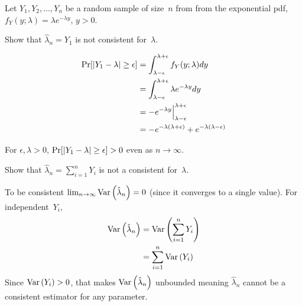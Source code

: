 \begin{problem}
   Let ${Y_1,Y_2,\ldots,Y_n}$ be a random sample of size~$n$ from from the exponential pdf, \linebreak${f_Y(y;\lambda) = \lambda e^{-\lambda y} \text{, } y > 0}$.
\end{problem}

\begin{subproblem}
  Show that ${\hat{\lambda}_n = Y_1}$ is not consistent for~$\lambda$.
\end{subproblem}




\begin{align}
  \Pr\lbrack\lvert Y_1 - \lambda\rvert \geq \epsilon\rbrack &= \int_{\lambda -\epsilon}^{\lambda + \epsilon} f_{Y}(y;\lambda) dy \\
                                                &= \int_{\lambda -\epsilon}^{\lambda + \epsilon} \lambda e^{-\lambda y} dy \\
                                                &= -e^{-\lambda y} \Big\vert_{\lambda -\epsilon}^{\lambda + \epsilon} \\
                                                &= -e^{-\lambda (\lambda + \epsilon)}  + e^{-\lambda (\lambda - \epsilon)}
\end{align}

For ${\epsilon,\lambda >0}$, ${\Pr\lbrack\lvert Y_1 - \lambda\rvert \geq \epsilon\rbrack > 0}$ even as ${n \rightarrow \infty}$.

\begin{subproblem}
  Show that ${\hat{\lambda}_n = \sum_{i=1}^{n} Y_i}$ is not a consistent for~$\lambda$.
\end{subproblem}

To be consistent ${\lim_{n \rightarrow \infty} \text{Var}\left(\hat{\lambda}_n\right) = 0}$ (since it converges to a single value). For independent~$Y_i$,
\begin{align}
  \text{Var}\left(\hat{\lambda}_n\right) &= \text{Var}\left(\sum_{i=1}^{n} Y_i\right) \\
                        &= \sum_{i=1}^{n} \text{Var}\left(Y_i\right)
\end{align}
Since ${\text{Var}\left(Y_i\right)>0}$, that makes $\text{Var}\left(\hat{\lambda}_n\right)$ unbounded meaning $\hat{\lambda}_{n}$ cannot be a consistent estimator for any parameter.

